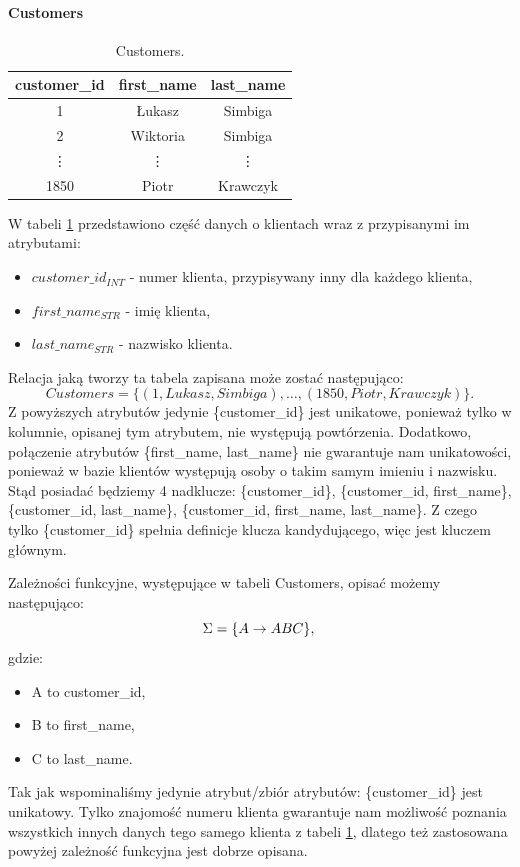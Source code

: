 \documentclass{article}
\theoremstyle{break}
\begin{document}
	\paragraph{Customers}
	\begin{table}[!ht]
		\centering
		\begin{tabular}{|c|c|c|}
			\hline
			customer\_id & first\_name & last\_name \\ \hline
			1 & Łukasz & Simbiga\\ \hline
			2 & Wiktoria & Simbiga \\ \hline
			\vdots & \vdots & \vdots \\ \hline
			1850 & Piotr & Krawczyk \\ \hline
		\end{tabular}
		\caption{Customers.}
		\label{table:customers}
	\end{table}
	W tabeli \ref{table:customers} przedstawiono część danych o klientach wraz z przypisanymi im atrybutami:
	\begin{itemize}
		\item $customer\_id_{INT}$ - numer klienta, przypisywany inny dla każdego klienta,
		\item $first\_name_{STR}$ - imię klienta,
		\item $last\_name_{STR}$ - nazwisko klienta.
	\end{itemize}
	Relacja jaką tworzy ta tabela zapisana może zostać następująco:
	$$ Customers=\{(1, Lukasz, Simbiga), \dots,(1850, Piotr, Krawczyk)\}.  $$
	Z powyższych atrybutów jedynie \{customer\_id\} jest unikatowe, ponieważ tylko w kolumnie, opisanej tym atrybutem, nie występują powtórzenia. Dodatkowo, połączenie atrybutów \{first\_name, last\_name\} nie gwarantuje nam unikatowości, ponieważ w bazie klientów występują osoby o takim samym imieniu i nazwisku. Stąd posiadać będziemy 4 nadklucze: \{customer\_id\}, \{customer\_id, first\_name\}, \{customer\_id, last\_name\}, \{customer\_id, first\_name, last\_name\}. Z czego tylko \{customer\_id\} spełnia definicje klucza kandydującego, więc jest kluczem głównym. 
	
	Zależności funkcyjne, występujące w tabeli Customers, opisać możemy następująco:
	$$ \Sigma = \{ A \rightarrow ABC \}, \\ $$
	gdzie: 
	\begin{itemize}
		\item A to customer\_id,
		\item B to first\_name,
		\item C to last\_name.
	\end{itemize}
	Tak jak wspominaliśmy jedynie atrybut/zbiór atrybutów: \{customer\_id\} jest unikatowy. Tylko znajomość numeru klienta gwarantuje nam możliwość poznania wszystkich innych danych tego samego klienta z tabeli \ref{table:customers}, dlatego też zastosowana powyżej zależność funkcyjna jest dobrze opisana.	
	
\end{document}
